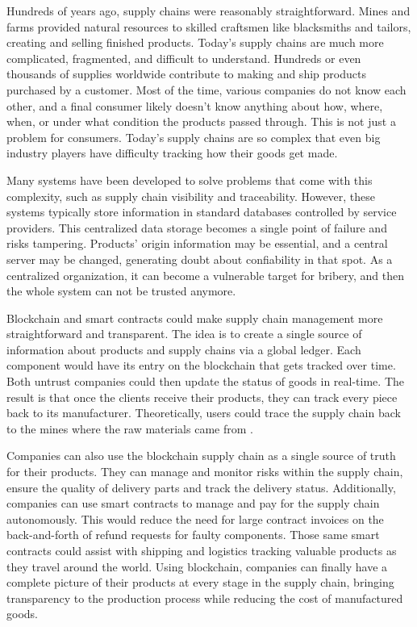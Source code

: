 
\acresetall 

Hundreds of years ago, supply chains were reasonably straightforward. Mines and farms provided natural resources to skilled craftsmen like blacksmiths and tailors, creating and selling finished products. Today's supply chains are much more complicated, fragmented, and difficult to understand. Hundreds or even thousands of supplies worldwide contribute to making and ship products purchased by a customer. Most of the time, various companies do not know each other, and a final consumer likely doesn't know anything about how, where, when, or under what condition the products passed through. This is not just a problem for consumers. Today's supply chains are so complex that even big industry players have difficulty tracking how their goods get made.

Many systems have been developed to solve problems that come with this complexity, such as supply chain visibility and traceability. However, these systems typically store information in standard databases controlled by service providers. This centralized data storage becomes a single point of failure and risks tampering. Products' origin information may be essential, and a central server may be changed, generating doubt about confiability in that spot. As a centralized organization, it can become a vulnerable target for bribery, and then the whole system can not be trusted anymore.

Blockchain and smart contracts could make supply chain management more straightforward and transparent. The idea is to create a single source of information about products and supply chains via a global ledger. Each component would have its entry on the blockchain that gets tracked over time. Both untrust companies could then update the status of goods in real-time. The result is that once the clients receive their products, they can track every piece back to its manufacturer. Theoretically, users could trace the supply chain back to the mines where the raw materials came from \cite{greve2018blockchain}.

Companies can also use the blockchain supply chain as a single source of truth for their products. They can manage and monitor risks within the supply chain, ensure the quality of delivery parts and track the delivery status. Additionally, companies can use smart contracts to manage and pay for the supply chain autonomously. This would reduce the need for large contract invoices on the back-and-forth of refund requests for faulty components. Those same smart contracts could assist with shipping and logistics tracking valuable products as they travel around the world. Using blockchain, companies can finally have a complete picture of their products at every stage in the supply chain, bringing transparency to the production process while reducing the cost of manufactured goods.

